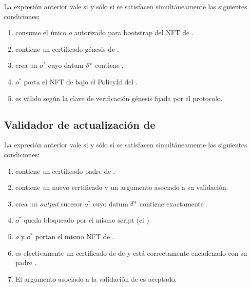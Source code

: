 \begin{center}
\MintValidatorNotation{\StakeDistributionMintValidator}
\end{center}

La expresión anterior vale si y sólo si se satisfacen simultáneamente las siguientes condiciones:

\begin{enumerate}[noitemsep]
  \item \tx consume el único \UTxO $o$ autorizado para bootstrap del NFT de \StakeDistribution.
  \item \redeemer contiene un certificado génesis \GenesisCertificate de \Mithril.
  \item \tx crea un \UTxO $o^*$ cuyo datum $\delta^*$ contiene \GenesisCertificate.
  \item $o^*$ porta el NFT de \StakeDistribution bajo el \textsf{PolicyId} del \MintingValidator.
  \item \GenesisCertificate es válido según la clave de verificación génesis \GenesisVerificationKey fijada por el protocolo.
\end{enumerate}

\subsection{Validador de actualización de \StakeDistribution}
\label{subsec:validadores-y-flujo-transaccional-validador-de-actualizacion-de-stakedistribution}

\begin{center}
\SpendValidatorNotation{\StakeDistributionSpendValidator}
\end{center}

La expresión anterior vale si y sólo si se satisfacen simultáneamente las siguientes condiciones:

\begin{enumerate}[noitemsep]
  \item \datum contiene un certificado padre \StakeDistributionCertificate de \Mithril.
  \item \redeemer contiene un nuevo certificado \StakeDistributionCertificateNew y un argumento \ZK asociado a su validación.
  \item \tx crea un \textit{output} sucesor $o^*$ cuyo datum  $\delta^*$ contiene exactamente \StakeDistributionCertificateNew.
  \item $o^*$ queda bloqueado por el mismo script (el \StakeDistributionSpendValidator).
  \item $o$ y $o^*$ portan el mismo NFT de \StakeDistribution.
  \item \StakeDistributionCertificateNew es efectivamente un certificado de \StakeDistribution de \Mithril y está correctamente encadenado con su padre \StakeDistributionCertificate.
  \item El argumento \ZK asociado a la validación de \StakeDistributionCertificateNew es aceptado.
\end{enumerate}

